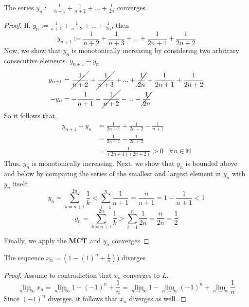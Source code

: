 \documentclass[12pt]{article}
\newcommand{\N}{\mathbb{N}}
\newcommand{\nifty}{\lim_{n \rightarrow \infty}}
\newenvironment{claim}[2][Claim]{\begin{trivlist}
		\item[\hskip \labelsep {\bfseries #1}\hskip \labelsep {\bfseries #2}]}{\end{trivlist}}
\begin{document}
\begin{claim}{3.3.10}
	The series $y_n := \frac{1}{n + 1} + \frac{1}{n + 2} + ... + \frac{1}{2n}$ converges.
\end{claim}
\begin{proof}
	If, $y_n := \frac{1}{n + 1} + \frac{1}{n + 2} + ... + \frac{1}{2n}$, then
	\begin{equation}
		y_{n + 1} := \frac{1}{n + 2} + \frac{1}{n + 3} + ... + \frac{1}{2n + 1} + \frac{1}{2n + 2}
	\end{equation}
	Now, we show that $y_n$ is monotonically increasing by considering two arbitrary consecutive elements. $y_{n+1} - y_n$
	\begin{align}
		y_{n+1} & = \cancel{\frac{1}{n + 2}} + \cancel{\frac{1}{n + 3}} + ... + \cancel{\frac{1}{2n}}  + \frac{1}{2n + 1} + \frac{1}{2n + 2}\\
		 - y_n   &  = -\frac{1}{n + 1} - \cancel{\frac{1}{n + 2}} - ... - \cancel{\frac{1}{2n}}
	\end{align}
	So it follows that,
	\begin{align*}
		y_{n+1} - y_n &= \frac{1}{2n + 1} + \frac{1}{2n+2} - \frac{1}{n+1}\\
							 &= \frac{1}{2n+1} - \frac{1}{2n+2}\\
							 &= \frac{1}{(2n+1)(2n+2)} > 0 \,\,\,\,\, \forall n \in \N
	\end{align*}
	Thus, $y_n$ is monotonically increasing. Next, we show that $y_n$ is bounded above and below by comparing the series of the smallest and largest element in $y_n$ with $y_n$ itself.
	\[ y_n = \sum_{k = n + 1}^{2n} \frac{1}{k} < \sum_{i = 1}^{n} \frac{1}{n + 1} = \frac{n}{n+1} = 1 - \frac{1}{n + 1} < 1 \]
	\[ y_n = \sum_{k = n + 1}^{2n} \frac{1}{k} > \sum_{i = 1}^{n} \frac{1}{2n} = \frac{n}{2n} = \frac{1}{2} \]

	Finally, we apply the \textbf{MCT} and $y_n$ converges
\end{proof}

\begin{claim}{3.4.4a}
	The sequence $x_n=(1 -(1)^n + \frac{1}{n}))$ diverges
\end{claim}
\begin{proof}
	Assume to contradiction that $x_n$ converges to $L$. 
	\[ \lim_{n \rightarrow \infty} x_n = \lim_{n \rightarrow \infty} 1 - (-1)^n + \frac{1}{n} = \nifty 1 - \nifty (-1)^n + \nifty \frac{1}{n} \]
	Since $(-1)^n$ diverges, it follows that $x_n$ diverges as well.
\end{proof}
\end{document}
